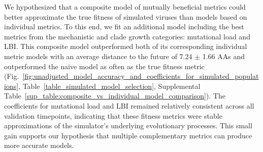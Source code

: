 We hypothesized that a composite model of mutually beneficial metrics could better approximate the true fitness of simulated viruses than models based on individual metrics.
To this end, we fit an additional model including the best metrics from the mechanistic and clade growth categories: mutational load and LBI.
This composite model outperformed both of its corresponding individual metric models with an average distance to the future of 7.24 $\pm$ 1.66 AAs and outperformed the naive model as often as the true fitness metric (Fig.~\ref{fig:unadjusted_model_accuracy_and_coefficients_for_simulated_populations}, Table~\ref{table_simulated_model_selection}, Supplemental Table~\ref{sup_table:composite_vs_individual_model_comparison}).
The coefficients for mutational load and LBI remained relatively consistent across all validation timepoints, indicating that these fitness metrics were stable approximations of the simulator's underlying evolutionary processes.
This small gain supports our hypothesis that multiple complementary metrics can produce more accurate models.

